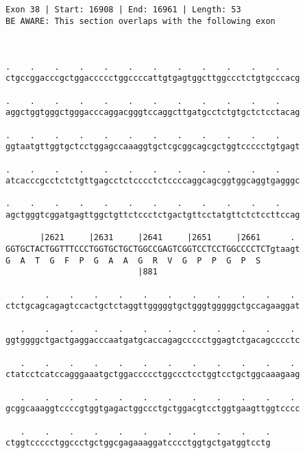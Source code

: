 \documentclass{article}
\begin{document}
\begin{Verbatim}
                                                      
 
Exon 38 | Start: 16908 | End: 16961 | Length: 53
BE AWARE: This section overlaps with the following exon



.    .    .    .    .    .    .    .    .    .    .    .    
ctgccggacccgctggaccccctggccccattgtgagtggcttggccctctgtgcccacg
                                                            
.    .    .    .    .    .    .    .    .    .    .    .    
aggctggtgggctgggacccaggacgggtccaggcttgatgcctctgtgctctcctacag
                                                            
.    .    .    .    .    .    .    .    .    .    .    .    
ggtaatgttggtgctcctggagccaaaggtgctcgcggcagcgctggtccccctgtgagt
                                                            
.    .    .    .    .    .    .    .    .    .    .    .    
atcacccgcctctctgttgagcctctcccctctccccaggcagcggtggcaggtgagggc
                                                            
.    .    .    .    .    .    .    .    .    .    .    .    
agctgggtcggatgagttggctgttctccctctgactgttcctatgttctctccttccag
                                                            
       |2621     |2631     |2641     |2651     |2661      . 
GGTGCTACTGGTTTCCCTGGTGCTGCTGGCCGAGTCGGTCCTCCTGGCCCCTCTgtaagt
G  A  T  G  F  P  G  A  A  G  R  V  G  P  P  G  P  S        
                           |881                             
  
   .    .    .    .    .    .    .    .    .    .    .    . 
ctctgcagcagagtccactgctctaggttgggggtgctgggtgggggctgccagaaggat
                                                            
   .    .    .    .    .    .    .    .    .    .    .    . 
ggtggggctgactgaggacccaatgatgcaccagagccccctggagtctgacagcccctc
                                                            
   .    .    .    .    .    .    .    .    .    .    .    . 
ctatcctcatccagggaaatgctggaccccctggccctcctggtcctgctggcaaagaag
                                                            
   .    .    .    .    .    .    .    .    .    .    .    . 
gcggcaaaggtccccgtggtgagactggccctgctggacgtcctggtgaagttggtcccc
                                                            
   .    .    .    .    .    .    .    .    .    .    .
ctggtccccctggccctgctggcgagaaaggatcccctggtgctgatggtcctg
                                                      

\end{Verbatim}
\end{document}
